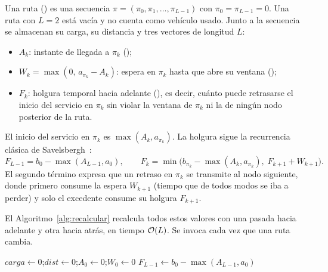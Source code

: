 Una ruta () es una secuencia $\pi=(\pi_0,\pi_1,\dots,\pi_{L-1})$ con
$\pi_0=\pi_{L-1}=0$. Una ruta con $L=2$ está vacía y no cuenta como vehículo usado. Junto a
la secuencia se almacenan su carga, su distancia y tres vectores de longitud $L$:
\begin{itemize}
\item $A_k$: instante de llegada a $\pi_k$ ();
\item $W_k=\max(0,\,a_{\pi_k}-A_k)$: espera en $\pi_k$ hasta que abre su ventana ();
\item $F_k$: holgura temporal hacia adelante (), es decir, cuánto puede
retrasarse el inicio del servicio en $\pi_k$ sin violar la ventana de $\pi_k$ ni la de ningún
nodo posterior de la ruta.
\end{itemize}
El inicio del servicio en $\pi_k$ es $\max(A_k,a_{\pi_k})$. La holgura sigue la recurrencia
clásica de Savelsbergh~\cite{savelsbergh1992}:
\begin{equation}
F_{L-1}=b_{0}-\max(A_{L-1},a_{0}),\qquad
F_k=\min\bigl(b_{\pi_k}-\max(A_k,a_{\pi_k}),\; F_{k+1}+W_{k+1}\bigr).
\label{eq:slack}
\end{equation}
El segundo término expresa que un retraso en $\pi_k$ se transmite al nodo siguiente, donde
primero consume la espera $W_{k+1}$ (tiempo que de todos modos se iba a perder) y solo el
excedente consume su holgura $F_{k+1}$.

El Algoritmo~\ref{alg:recalcular} recalcula todos estos valores con una pasada hacia adelante
y otra hacia atrás, en tiempo $\mathcal{O}(L)$. Se invoca cada vez que una ruta cambia.

\begin{algorithm}[H]
\caption{ ()}
\label{alg:recalcular}
$\textit{carga}\gets 0$;\quad $\textit{dist}\gets 0$;\quad $A_0\gets 0$;\quad $W_0\gets 0$\;
$F_{L-1}\gets b_{0}-\max(A_{L-1},a_{0})$\;
\end{algorithm}

